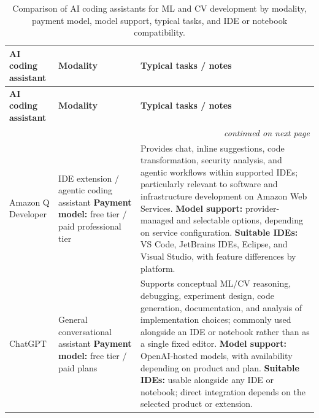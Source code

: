 \documentclass{article}
\newcounter{entry}[section]
\renewcommand{\theentry}{\thesection.\arabic{entry}}
\newcommand{\EntryRow}[5]{
    \noalign{
        \stepcounter{entry}
        \xdef\ENTRYNUM{\theentry}
        \phantomsection\label{entry:#1}
        \addcontentsline{toc}{subsubsection}{\ENTRYNUM\hspace{0.5cm}#2}
    }
    #2 #3 & #4 & #5 \\
    \hline
}
\begin{document}
\clearpage




\begin{longtable}{|p{}|p{}|p{}|}
    \caption{Comparison of AI coding assistants for ML and CV development by modality, payment model, model support, typical tasks, and IDE or notebook compatibility.}
    \label{table:overview_AI_coding_assistants} \\


    \hline
    \textbf{AI coding assistant} & \textbf{Modality} & \textbf{Typical tasks / notes} \\
    \hline
    \endfirsthead

    \hline
    \textbf{AI coding assistant} & \textbf{Modality} & \textbf{Typical tasks / notes} \\
    \hline
    \endhead

    \multicolumn{3}{r}{\textit{continued on next page}} \\
    \endfoot

    \endlastfoot


    \EntryRow{amazon_q_developer}{Amazon Q Developer}{\cite{amazon2026qdeveloper}}{IDE extension / agentic coding assistant \newline \textbf{Payment model:} free tier / paid professional tier}{Provides chat, inline suggestions, code transformation, security analysis, and agentic workflows within supported IDEs; particularly relevant to software and infrastructure development on Amazon Web Services. \newline \textbf{Model support:} provider-managed and selectable options, depending on service configuration. \newline \textbf{Suitable IDEs:} VS Code, JetBrains IDEs, Eclipse, and Visual Studio, with feature differences by platform.}

    \EntryRow{chatgpt}{ChatGPT}{\cite{khojah2024beyond}}{General conversational assistant \newline \textbf{Payment model:} free tier / paid plans}{Supports conceptual ML/CV reasoning, debugging, experiment design, code generation, documentation, and analysis of implementation choices; commonly used alongside an IDE or notebook rather than as a single fixed editor. \newline \textbf{Model support:} OpenAI-hosted models, with availability depending on product and plan. \newline \textbf{Suitable IDEs:} usable alongside any IDE or notebook; direct integration depends on the selected product or extension.}


\end{longtable}
\end{document}
